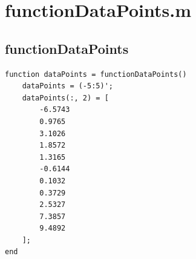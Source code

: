 \section{functionDataPoints.m}
\subsection{functionDataPoints}
\begin{simplechar}
\begin{lstlisting}
function dataPoints = functionDataPoints()
    dataPoints = (-5:5)';
    dataPoints(:, 2) = [
        -6.5743
        0.9765
        3.1026
        1.8572
        1.3165
        -0.6144
        0.1032
        0.3729
        2.5327
        7.3857
        9.4892
    ];
end
\end{lstlisting}
\end{simplechar}

